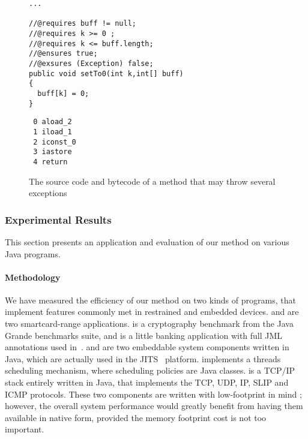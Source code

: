 \begin{figure}
\begin{minipage}[b]{0.5\linewidth}
\begin{verbatim}
...

//@requires buff != null;
//@requires k >= 0 ;
//@requires k <= buff.length;
//@ensures true;
//@exsures (Exception) false;
public void setTo0(int k,int[] buff)
{
  buff[k] = 0;
}
\end{verbatim}
\end{minipage}
\hspace{.5cm}
\begin{minipage}[b]{0.4\linewidth}
 \begin{verbatim}
 0 aload_2
 1 iload_1
 2 iconst_0
 3 iastore
 4 return
\end{verbatim}
\end{minipage}
\caption{\sc The source code and bytecode of a method that may throw several exceptions}
\label{fig:jmlpreciseex}
\end{figure}

\subsubsection{Experimental Results}
\label{sec:experiments}

This section presents an application and evaluation of our method on various Java programs.

\paragraph{Methodology}

We have measured the efficiency of our method on two kinds of programs, that implement features commonly met in restrained and embedded devices.  and  are two smartcard-range applications.  is a cryptography benchmark from the Java Grande benchmarks suite, and  is a little banking application with full JML annotations used in~\cite{BRL-JACK}.  and  are two embeddable system components written in Java, which are actually used in the JITS~\cite{JITSWebsite} platform.  implements a threads scheduling mechanism, where scheduling policies are Java classes.  is a TCP/IP stack entirely written in Java, that implements the TCP, UDP, IP, SLIP and ICMP protocols. These two components are written with low-footprint in mind ; however, the overall system performance would greatly benefit from having them available in native form, provided the memory footprint cost is not too important.

